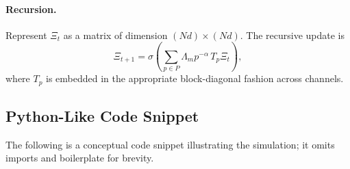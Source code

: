 \documentclass[12pt]{article}
\begin{document}
\paragraph{Recursion.}

Represent \(\Xi_t\) as a matrix of dimension \((Nd)\times(Nd)\). The recursive update is
\[
  \Xi_{t+1} = \sigma\!\left( \sum_{p\in P} \Lambda_m p^{-\alpha}\, T_p \Xi_t \right),
\]
where \(T_p\) is embedded in the appropriate block-diagonal fashion across channels.

\subsection{Python-Like Code Snippet}

The following is a conceptual code snippet illustrating the simulation; it omits imports and boilerplate for brevity.
\end{document}
